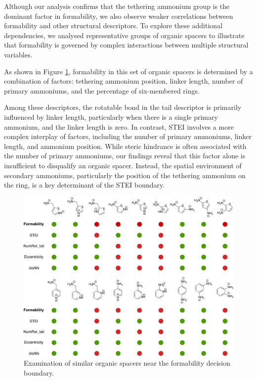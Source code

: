 Although our analysis confirms that the tethering ammonium group is the dominant factor in formability, we also observe weaker correlations between formability and other structural descriptors. To explore these additional dependencies, we analysed representative groups of organic spacers to illustrate that formability is governed by complex interactions between multiple structural variables.

As shown in Figure \ref{fig:figure5.10}, formability in this set of organic spacers is determined by a combination of factors: tethering ammonium position, linker length, number of primary ammoniums, and the percentage of six-membered rings. 

Among these descriptors, the rotatable bond in the tail descriptor is primarily influenced by linker length, particularly when there is a single primary ammonium, and the linker length is zero. In contrast, STEI involves a more complex interplay of factors, including the number of primary ammoniums, linker length, and ammonium position. While steric hindrance is often associated with the number of primary ammoniums, our findings reveal that this factor alone is insufficient to disqualify an organic spacer. Instead, the spatial environment of secondary ammoniums, particularly the position of the tethering ammonium on the ring, is a key determinant of the STEI boundary. 

\begin{figure}[htbp]
    \centering
    \includegraphics[width=\textwidth]{figures/synthesis-feasibility/figure5-10.png}
    \caption{Examination of similar organic spacers near the formability decision boundary. }
    \label{fig:figure5.10}
\end{figure}


